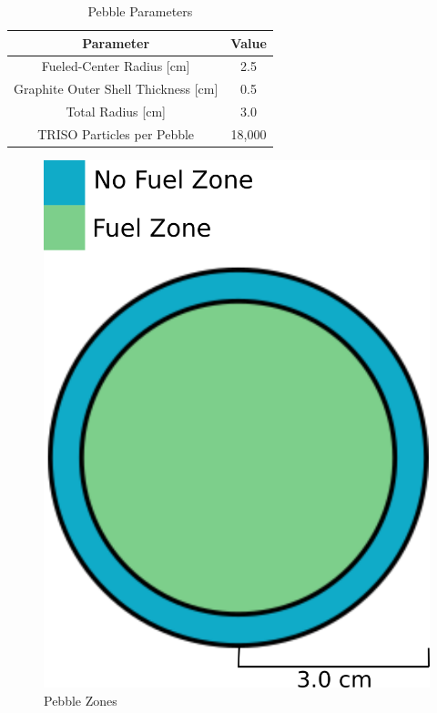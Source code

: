 \begin{table}[h!]
\centering

\caption{Pebble Parameters}
\begin{tabular}{ c  c }
\hline
Parameter & Value \\
\hline
Fueled-Center Radius [cm] & 2.5 \\
Graphite Outer Shell Thickness [cm] & 0.5 \\
Total Radius [cm] & 3.0 \\
TRISO Particles per Pebble & 18,000 \\
\hline
\end{tabular}
\label{table:peb-params}
\end{table}

\begin{figure}[H]
\centering

\includegraphics[width=0.5\linewidth]{figures/pebble-zones.png}
\caption{Pebble Zones}
\label{fig:pebb-zone1}
\end{figure}
